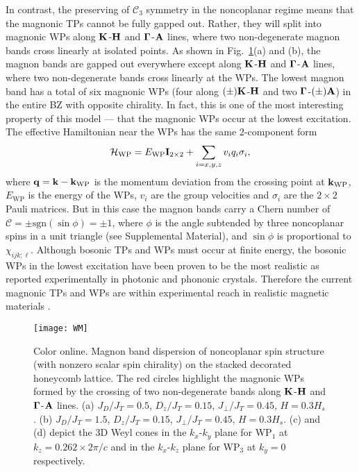 \documentclass[doublecol]{epl2}
\begin{document}
In contrast, the preserving of $\mathcal C_{3}$ symmetry in the noncoplanar regime means that the magnonic TPs cannot be fully gapped out. Rather, they will split into magnonic WPs  along ${\bf K}$-${\bf H}$  and  ${\bf \Gamma}$-${\bf A}$ lines, where two non-degenerate magnon bands cross linearly at isolated points.    As shown in Fig.~\ref{WM}(a) and (b), the magnon bands are gapped out everywhere except along  ${\bf K}$-${\bf H}$  and  ${\bf \Gamma}$-${\bf A}$ lines, where two non-degenerate bands cross linearly at the WPs.  The lowest magnon band has a total of six magnonic WPs (four along $(\pm){\bf K}$-${\bf H}$  and  two ${\bf \Gamma}$-$(\pm){\bf A}$) in the entire BZ with opposite chirality. In fact, this is one of the most interesting property of this model --- that the magnonic WPs occur at the lowest excitation. The effective Hamiltonian near the WPs has the same 2-component form 
\begin{align}
\mathcal H_{\text{WP}}= E_{\text{WP}}\bold{I}_{2\times 2}+\sum_{i=x,y,z}v_iq_i\sigma_i,
\label{DP}
\end{align}
where $\bold{q}=\bold{k}-\bold{k}_{\text{WP}}$ is the momentum deviation from the crossing point at $\bold{k}_{\text{WP}}$, $E_{\text{WP}}$ is the energy of the WPs, $v_i$ are the group velocities and $\sigma_i$ are the $2\times 2$ Pauli matrices. But in this case the magnon bands carry a Chern number of $\mathcal C= \pm\text{sgn}(\sin\phi)=\pm 1$, where $\phi$ is the angle subtended by three noncoplanar spins in a unit triangle (see Supplemental Material), and $\sin\phi$ is proportional to  $\chi_{ijk; \ell}$.  Although  bosonic TPs and WPs must occur at finite energy, the bosonic WPs in the lowest excitation have been proven to be the most realistic as reported experimentally in photonic \cite{lu} and phononic  \cite{fee} crystals. Therefore the current magnonic TPs and WPs are within experimental reach in realistic magnetic materials \cite{zheng}. 
 
  \begin{figure}
\centering
\texttt{[image: WM]}
\caption{Color online. Magnon band dispersion  of noncoplanar spin structure (with nonzero scalar spin chirality) on the stacked decorated honeycomb lattice.  The red circles highlight the magnonic WPs formed by the crossing of two non-degenerate bands along  ${\bf K}$-${\bf H}$  and  ${\bf \Gamma}$-${\bf A}$ lines. (a)    $J_D/J_T = 0.5$,  $D_z/J_T = 0.15$, $J_\perp/J_T = 0.45$, $H=0.3H_s$.  (b)   $J_D/J_T = 1.5$,  $D_z/J_T = 0.15$,  $J_\perp/J_T = 0.45$, $H=0.3H_s$. (c) and (d) depict the 3D Weyl cones  in the $k_x$-$k_y$ plane for WP$_1$ at  $k_z=0.262\times 2\pi/c$  and in the $k_x$-$k_z$  plane  for WP$_3$  at $k_y=0$  respectively.  }
\label{WM}
\end{figure} 
\end{document}
